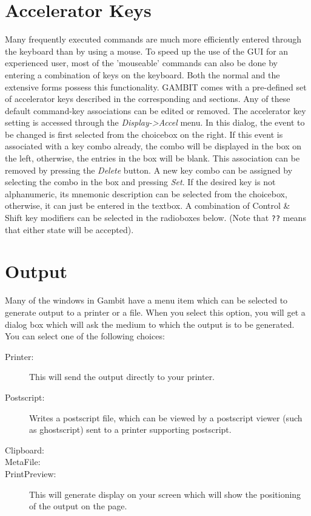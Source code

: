 {\section{Accelerator Keys}\label{Accelerators}

Many frequently executed commands are much more efficiently entered
through the keyboard than by using a mouse.  To speed up the use of the
GUI for an experienced user, most of the 'mouseable' commands can also be
done by entering a combination of keys on the keyboard.  Both the normal
and the extensive forms possess this functionality.  GAMBIT comes with a
pre-defined set of accelerator keys described in the corresponding 
 and 
 sections.  Any of these default command-key
associations can be edited or removed.  The accelerator key setting is
accessed through the {\em Display->Accel} menu.  In this dialog, the event
to be changed is first selected from the choicebox on the right.  If this
event is associated with a key combo already, the combo will be displayed
in the box on the left, otherwise, the entries in the box will be blank.
This association can be removed by pressing the {\em Delete} button.  A
new key combo can be assigned by selecting the combo in the box and
pressing {\em Set}.  If the desired key is not alphanumeric, its mnemonic
description can be selected from the choicebox, otherwise, it can just be
entered in the textbox.  A combination of Control \& Shift key modifiers
can be selected in the radioboxes below.  (Note that \verb+??+  means that either
state will be accepted).

\section{Output}\label{outputsec}
Many of the windows in Gambit have a menu item which can be 
selected to generate output to a printer or a file.  When you select this 
option, you will get a dialog box which will ask the medium to which the 
output is to be generated.  You can select one of the following 
choices:
\begin{description}
\item[Printer:] This will send the output directly to your printer. 
\item[Postscript:] Writes a postscript file, which can be viewed by a 
postscript viewer (such as ghostscript) sent to a printer 
supporting postscript.  
\item[Clipboard:] 
\item[MetaFile:]
\item[PrintPreview:]  This will generate display on your screen which will 
show the positioning of the output on the page.   
\end{description}

}

